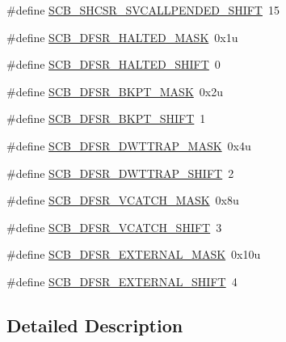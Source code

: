 \begin{DoxyCompactItemize}
\item 
\#define \hyperlink{group___s_c_b___register___masks_gad441fbcc06889927347ce287c2520a97}{S\+C\+B\+\_\+\+S\+H\+C\+S\+R\+\_\+\+S\+V\+C\+A\+L\+L\+P\+E\+N\+D\+E\+D\+\_\+\+S\+H\+I\+FT}~15
\item 
\#define \hyperlink{group___s_c_b___register___masks_ga68d1b868063cb70eb3bf3af375bea3cd}{S\+C\+B\+\_\+\+D\+F\+S\+R\+\_\+\+H\+A\+L\+T\+E\+D\+\_\+\+M\+A\+SK}~0x1u
\item 
\#define \hyperlink{group___s_c_b___register___masks_ga5715d28eed87f24337cf4391a1d65e41}{S\+C\+B\+\_\+\+D\+F\+S\+R\+\_\+\+H\+A\+L\+T\+E\+D\+\_\+\+S\+H\+I\+FT}~0
\item 
\#define \hyperlink{group___s_c_b___register___masks_gaa21a685119e3829d559a25c8adf5cccb}{S\+C\+B\+\_\+\+D\+F\+S\+R\+\_\+\+B\+K\+P\+T\+\_\+\+M\+A\+SK}~0x2u
\item 
\#define \hyperlink{group___s_c_b___register___masks_gab2da04235aa0df8d6d867336d1b2c9c5}{S\+C\+B\+\_\+\+D\+F\+S\+R\+\_\+\+B\+K\+P\+T\+\_\+\+S\+H\+I\+FT}~1
\item 
\#define \hyperlink{group___s_c_b___register___masks_gaa6d8e1428ddb9a650f965c33e09bad7a}{S\+C\+B\+\_\+\+D\+F\+S\+R\+\_\+\+D\+W\+T\+T\+R\+A\+P\+\_\+\+M\+A\+SK}~0x4u
\item 
\#define \hyperlink{group___s_c_b___register___masks_ga6a1d724f4fe22533bd37c3f5179d2219}{S\+C\+B\+\_\+\+D\+F\+S\+R\+\_\+\+D\+W\+T\+T\+R\+A\+P\+\_\+\+S\+H\+I\+FT}~2
\item 
\#define \hyperlink{group___s_c_b___register___masks_ga44491a07e0ef59bfe8f7797f03acfabd}{S\+C\+B\+\_\+\+D\+F\+S\+R\+\_\+\+V\+C\+A\+T\+C\+H\+\_\+\+M\+A\+SK}~0x8u
\item 
\#define \hyperlink{group___s_c_b___register___masks_gaa503bd566d848235828e742233b8ff20}{S\+C\+B\+\_\+\+D\+F\+S\+R\+\_\+\+V\+C\+A\+T\+C\+H\+\_\+\+S\+H\+I\+FT}~3
\item 
\#define \hyperlink{group___s_c_b___register___masks_ga938e2bfb90d14dba16b2dd249b6cdbdd}{S\+C\+B\+\_\+\+D\+F\+S\+R\+\_\+\+E\+X\+T\+E\+R\+N\+A\+L\+\_\+\+M\+A\+SK}~0x10u
\item 
\#define \hyperlink{group___s_c_b___register___masks_ga0c4c283537c78ec5650fd7eaaf8c9cd7}{S\+C\+B\+\_\+\+D\+F\+S\+R\+\_\+\+E\+X\+T\+E\+R\+N\+A\+L\+\_\+\+S\+H\+I\+FT}~4
\end{DoxyCompactItemize}


\subsection{Detailed Description}


